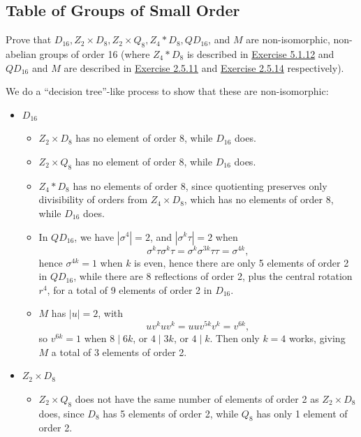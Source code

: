 \newpage

\subsection{Table of Groups of Small Order}

\begin{exercise}\label{ex5.3.1}
    Prove that $D_{16}, Z_2 \times D_8, Z_2 \times Q_8, Z_4 * D_8, QD_{16}$, and $M$ are non-isomorphic, non-abelian groups of order 16 (where $Z_4 * D_8$ is described in \hyperref[ex5.1.12]{Exercise 5.1.12} and $QD_{16}$ and $M$ are described in \hyperref[ex2.5.11]{Exercise 2.5.11} and \hyperref[ex2.5.14]{Exercise 2.5.14} respectively).
\end{exercise}

\begin{sol}
    We do a ``decision tree''-like process to show that these are non-isomorphic:
    \begin{itemize}
        \item $D_{16}$
        \begin{itemize}
            \item $Z_2 \times D_8$ has no element of order 8, while $D_{16}$ does.
            \item $Z_2 \times Q_8$ has no element of order 8, while $D_{16}$ does.
            \item $Z_4 * D_8$ has no elements of order 8, since quotienting preserves only divisibility of orders from $Z_4 \times D_8$, which has no elements of order 8, while $D_{16}$ does.
            \item In $QD_{16}$, we have $|\sigma^4| = 2$, and $|\sigma^k\tau| = 2$ when
            \[\sigma^k\tau\sigma^k\tau = \sigma^k\sigma^{3k}\tau\tau = \sigma^{4k},\]
            hence $\sigma^{4k} = 1$ when $k$ is even, hence there are only 5 elements of order 2 in $QD_{16}$, while there are 8 reflections of order 2, plus the central rotation $r^4$, for a total of 9 elements of order 2 in $D_{16}$.
            \item $M$ has $|u| = 2$, with
            \[uv^kuv^k = uuv^{5k}v^k = v^{6k},\]
            so $v^{6k} = 1$ when $8 \mid 6k$, or $4 \mid 3k$, or $4 \mid k$. Then only $k = 4$ works, giving $M$ a total of 3 elements of order 2.
        \end{itemize}
        \item $Z_2 \times D_8$
        \begin{itemize}
            \item $Z_2 \times Q_8$ does not have the same number of elements of order 2 as $Z_2 \times D_8$ does, since $D_8$ has 5 elements of order 2, while $Q_8$ has only 1 element of order 2.

\end{itemize}
\end{itemize}
\end{sol}
